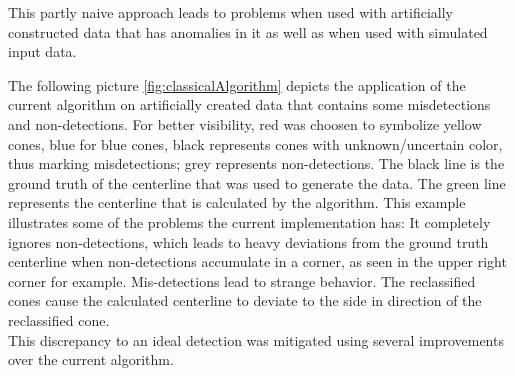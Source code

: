 This partly naive approach leads to problems when used with artificially constructed data that has anomalies in it as well as when used with simulated input data.

The following picture \ref{fig:classicalAlgorithm} depicts the application of the current algorithm on artificially created data that contains some misdetections and non-detections. For better visibility, red was choosen to symbolize yellow cones, blue for blue cones, black represents cones with unknown/uncertain color, thus marking misdetections; grey represents non-detections. The black line is the ground truth of the centerline that was used to generate the data. The green line represents the centerline that is calculated by the algorithm. This example illustrates some of the problems the current implementation has: It completely ignores non-detections, which leads to heavy deviations from the ground truth centerline when non-detections accumulate in a corner, as seen in the upper right corner for example. Mis-detections lead to strange behavior. The reclassified cones cause the calculated centerline to deviate to the side in direction of the reclassified cone.
\\This discrepancy to an ideal detection was mitigated using several improvements over the current algorithm.

